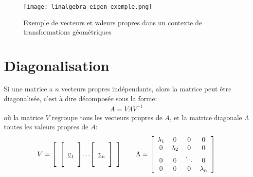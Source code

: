 \begin{figure}[H]
	\centering
		\texttt{[image: linalgebra\_eigen\_exemple.png]}
	\caption{Exemple de vecteurs et valeurs propres dans un contexte de transformations géométriques}
	\label{fig:linalgebra_eigen_exemple}
\end{figure}

\section{Diagonalisation}

Si une matrice a $n$ vecteurs propres indépendants, alors la matrice peut être diagonalisée, c'est à dire décomposée sous la forme:
\begin{align}
A = V \Lambda V^{-1}
\label{eq:diagmatrix}
\end{align}
où la matrice $V$ regroupe tous les vecteurs propres de $A$, et la matrice diagonale $\Lambda$ toutes les valeurs propres  de $A$:
\begin{align}
V = 
\left[ \begin{array}{c@{}c@{}c}  
\left[  \begin{array}{c}  \\ \underline{v}_1 \\ \\ \end{array} \right] &  \ldots & \left[  \begin{array}{c} \\ \underline{v}_n \\ \\ \end{array} \right]
\end{array} \right]
\quad \quad
\Lambda = 
\left[ \begin{array}{c c c c}  
\lambda_1 &  0          & 0 & 0 \\
0         &  \lambda_2  & 0      & 0 \\
0         &  0          &\ddots  & 0 \\
0         &  0          & 0  & \lambda_n
\end{array} \right]
\end{align}

